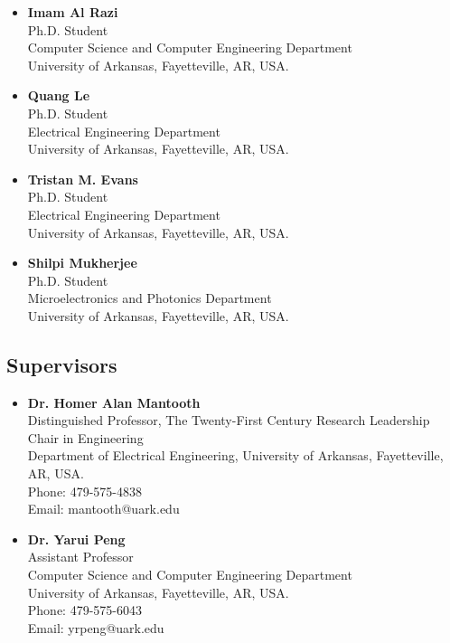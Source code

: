 \documentclass[11pt]{article}
\begin{document}
\begin{itemize}

\item \textbf{Imam Al Razi} \\
Ph.D. Student\\
Computer Science and Computer Engineering Department\\
University of Arkansas, Fayetteville, AR, USA.


\item \textbf{Quang Le} \\
Ph.D. Student\\
Electrical Engineering Department\\
University of Arkansas, Fayetteville, AR, USA.\\


\item\textbf{Tristan M. Evans}\\
Ph.D. Student\\
Electrical Engineering Department\\
University of Arkansas, Fayetteville, AR, USA.\\

\item\textbf{Shilpi Mukherjee}\\
Ph.D. Student\\
Microelectronics and Photonics Department\\
University of Arkansas, Fayetteville, AR, USA.\\
\end{itemize}

\subsection{Supervisors}

\begin{itemize}
   
\item\textbf{Dr. Homer Alan Mantooth}\\
Distinguished Professor, The Twenty-First Century Research Leadership Chair in Engineering\\
Department of Electrical Engineering, University of Arkansas, Fayetteville, AR, USA.\\
Phone: 479-575-4838\\
Email: mantooth@uark.edu\\

\item\textbf{Dr. Yarui Peng}\\
Assistant Professor\\
Computer Science and Computer Engineering Department\\ 
University of Arkansas, Fayetteville, AR, USA.\\
Phone: 479-575-6043\\
Email: yrpeng@uark.edu\\  

\end{itemize}



\end{document}
